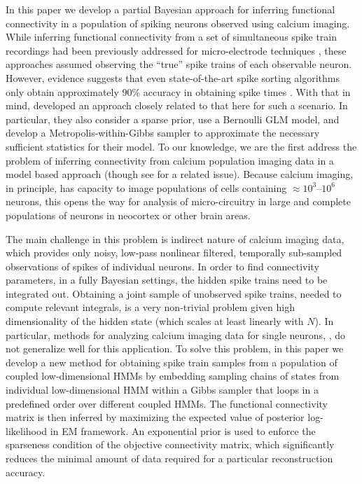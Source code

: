 In this paper we develop a partial Bayesian approach for inferring functional connectivity in a population of spiking neurons observed using calcium imaging. While inferring functional connectivity from a set of simultaneous spike train recordings had been previously addressed for micro-electrode techniques \cite{PAN03c, TRUC05}, these approaches assumed observing the ``true'' spike trains of each observable neuron.  However, evidence suggests that even state-of-the-art spike sorting algorithms only obtain approximately $90\%$ accuracy in obtaining spike times \cite{HarrisBuzsaki00, WoodBlack08}.  With that in mind, \cite{Rigat06} developed an approach closely related to that here for such a scenario.  In particular, they also consider a sparse prior, use a Bernoulli GLM model, and develop a Metropolis-within-Gibbs sampler to approximate the necessary sufficient statistics for their model.  To our knowledge, we are the first address the problem of inferring connectivity from calcium population imaging data in a model based approach (though see \cite{Roxin08} for a related issue).  Because calcium imaging, in principle, has capacity to image populations of cells containing $\approx 10^3$--$10^6$ neurons, this opens the way for analysis of micro-circuitry in large and complete populations of neurons in neocortex or other brain areas.

The main challenge in this problem is indirect nature of calcium imaging data, which provides only noisy, low-pass nonlinear filtered, temporally sub-sampled observations of spikes of individual neurons. In order to find connectivity parameters, in a fully Bayesian settings, the hidden spike trains need to be integrated out. Obtaining a joint sample of unobserved spike trains, needed to compute relevant integrals, is a very non-trivial problem given high dimensionality of the hidden state (which scales at least linearly with $N$). In particular, methods for analyzing calcium imaging data for single neurons, \cite{Vogelstein2009}, do not generalize well for this application. To solve this problem, in this paper we develop a new method for obtaining spike train samples from a population of coupled low-dimensional HMMs by embedding sampling chains of states from individual low-dimensional HMM within a Gibbs sampler that loops in a predefined order over different coupled HMMs. The functional connectivity matrix is then inferred by maximizing the expected value of posterior log-likelihood in EM framework. An exponential prior is used to enforce the sparseness condition of the objective connectivity matrix, which significantly reduces the minimal amount of data required for a particular reconstruction accuracy.

